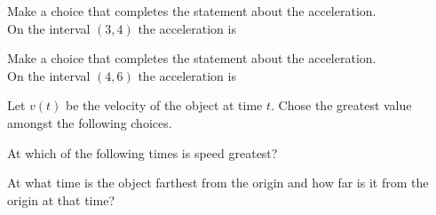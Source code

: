 \documentclass{ximera}
\begin{document}
\begin{exercise}
\begin{exercise}
Make a choice that completes the statement about the acceleration.\\

On the interval $(3,4)$  the acceleration is
\begin{multipleChoice}
\end{multipleChoice}
\end{exercise}
\begin{exercise}

Make a choice that completes the statement about the acceleration.\\

On the interval $(4,6)$  the acceleration is
\begin{multipleChoice}
\end{multipleChoice}
\end{exercise}
\begin{exercise}

Let $v(t)$ be the velocity of the object at time $t$.  Chose the greatest value amongst the following choices.
\begin{multipleChoice}
\end{multipleChoice}
\end{exercise}
\begin{exercise}

At which of the following times is speed greatest?
\begin{multipleChoice}
\end{multipleChoice}
\end{exercise}
\begin{exercise}

At what time is the object farthest from the origin and how far is it from the origin at that time?
\begin{multipleChoice}
\end{multipleChoice}
\end{exercise}
\end{exercise}
\end{document}
